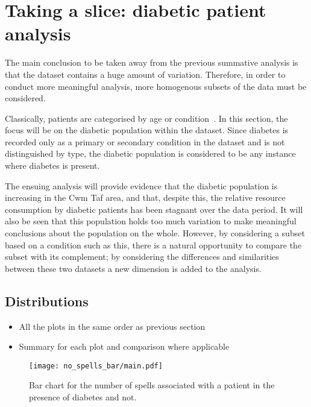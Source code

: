 \section{Taking a slice: diabetic patient analysis}\label{sec:diabetes}

The main conclusion to be taken away from the previous summative analysis is
that the dataset contains a huge amount of variation. Therefore, in order to
conduct more meaningful analysis, more homogenous subsets of the data must be
considered.

Classically, patients are categorised by age or condition~\cite{Vuik2016}. In
this section, the focus will be on the diabetic population within the dataset.
Since diabetes is recorded only as a primary or secondary condition in the
dataset and is not distinguished by type, the diabetic population is considered
to be any instance where diabetes is present.

The ensuing analysis will provide evidence that the diabetic population is
increasing in the Cwm Taf area, and that, despite this, the relative resource
consumption by diabetic patients has been stagnant over the data period. It will
also be seen that this population holds too much variation to make meaningful 
conclusions about the population on the whole. However, by considering a subset
based on a condition such as this, there is a natural opportunity to compare
the subset with its complement; by considering the differences and similarities
between these two datasets a new dimension is added to the analysis.


\subsection{Distributions}\label{subsec:diabetes_dists}

\begin{itemize}
    \item All the plots in the same order as previous section
    \item Summary for each plot and comparison where applicable
\end{itemize}


\begin{figure}[htbp]
    \centering
    \texttt{[image: no\_spells\_bar/main.pdf]}
    \caption{Bar chart for the number of spells associated with a patient in the
        presence of diabetes and not.}%
    \label{fig:diabetes_no_spells_bar}
\end{figure}

